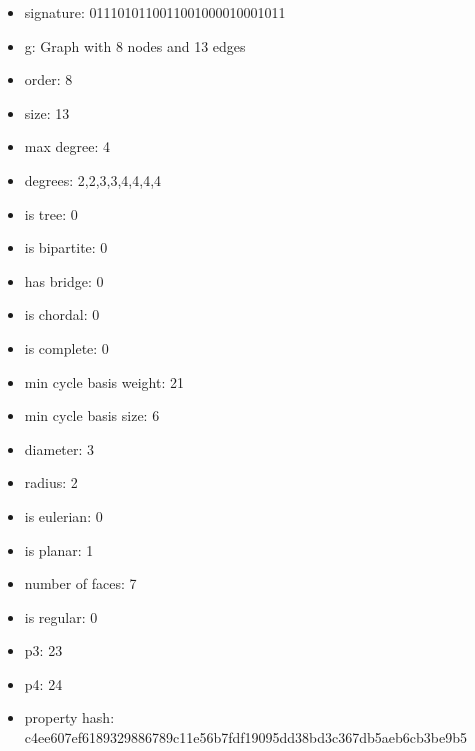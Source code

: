 \begin{itemize}
\item signature: 0111010110011001000010001011
\item g: Graph with 8 nodes and 13 edges
\item order: 8
\item size: 13
\item max degree: 4
\item degrees: 2,2,3,3,4,4,4,4
\item is tree: 0
\item is bipartite: 0
\item has bridge: 0
\item is chordal: 0
\item is complete: 0
\item min cycle basis weight: 21
\item min cycle basis size: 6
\item diameter: 3
\item radius: 2
\item is eulerian: 0
\item is planar: 1
\item number of faces: 7
\item is regular: 0
\item p3: 23
\item p4: 24
\item property hash: c4ee607ef6189329886789c11e56b7fdf19095dd38bd3c367db5aeb6cb3be9b5
\end{itemize}
\newpage
\begin{figure}
\end{figure}
